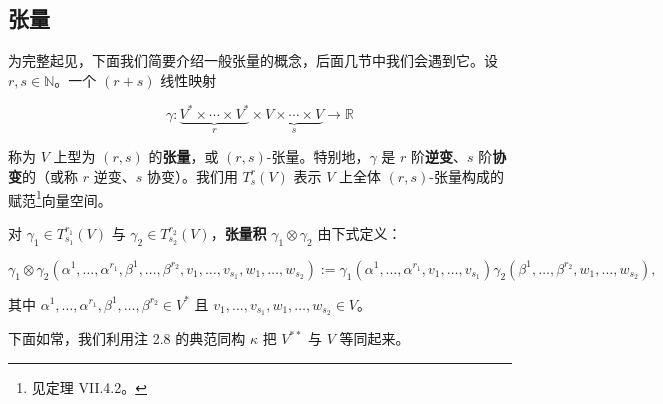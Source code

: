\subsection*{张量}

为完整起见，下面我们简要介绍一般张量的概念，后面几节中我们会遇到它。设 $ r, s \in \mathbb{N} $。一个 $ (r + s) $ 线性映射

\[
\gamma: \underbrace{V^* \times \cdots \times V^*}_{r} \times \underbrace{V \times \cdots \times V}_{s} \to \mathbb{R}
\]

称为 $ V $ 上型为 $ (r, s) $ 的\textbf{张量}，或 $ (r, s) $-张量。特别地，$ \gamma $ 是 $ r $ 阶\textbf{逆变}、$ s $ 阶\textbf{协变}的（或称 $ r $ 逆变、$ s $ 协变）。我们用 $ T^r_s(V) $ 表示 $ V $ 上全体 $ (r, s) $-张量构成的赋范\footnote{见定理 VII.4.2。}向量空间。

对 $ \gamma_1 \in T^{r_1}_{s_1}(V) $ 与 $ \gamma_2 \in T^{r_2}_{s_2}(V) $，\textbf{张量积} $ \gamma_1 \otimes \gamma_2 $ 由下式定义：

\[
\gamma_1 \otimes \gamma_2(\alpha^1, \ldots, \alpha^{r_1}, \beta^1, \ldots, \beta^{r_2}, v_1, \ldots, v_{s_1}, w_1, \ldots, w_{s_2}) := \gamma_1(\alpha^1, \ldots, \alpha^{r_1}, v_1, \ldots, v_{s_1})\gamma_2(\beta^1, \ldots, \beta^{r_2}, w_1, \ldots, w_{s_2}) ,
\]

其中 $ \alpha^1, \ldots, \alpha^{r_1}, \beta^1, \ldots, \beta^{r_2} \in V^* $ 且 $ v_1, \ldots, v_{s_1}, w_1, \ldots, w_{s_2} \in V $。

下面如常，我们利用注 2.8 的典范同构 $ \kappa $ 把 $ V^{\ast\ast} $ 与 $ V $ 等同起来。

